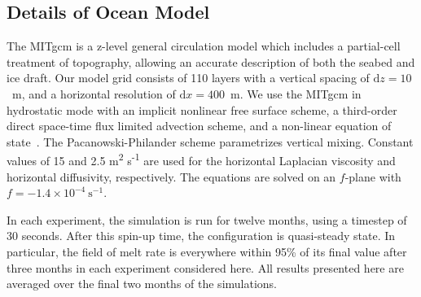 \documentclass[draft]{agujournal2019}
\begin{document}
\subsection{Details of Ocean Model}\label{S:Experiment:Model}
The MITgcm is a z-level general circulation model which includes a partial-cell treatment of topography, allowing an accurate description of both the seabed and ice draft. Our model grid consists of 110 layers with a vertical spacing of $\mathrm{d}z = 10$~m, and a horizontal resolution of $\mathrm{d}x=400$~m. We use the MITgcm in hydrostatic mode with an implicit nonlinear free surface scheme, a third-order direct space-time flux limited advection scheme, and a non-linear equation of state~\cite{Mcdougall2003JAtmosOceanTech}. The Pacanowski-Philander \cite{Pacanowski1981JPhysOcean} scheme parametrizes vertical mixing. Constant values of 15 and 2.5
m\textsuperscript{2} s\textsuperscript{-1} are used for the horizontal Laplacian viscosity and horizontal diffusivity, respectively. The equations are solved on an $f$-plane with $f = -1.4\times10^{-4}~\text{s}^{-1}$.

In each experiment, the simulation is run for twelve months, using a timestep of 30 \si{seconds}. After this spin-up time, the configuration is quasi-steady state. In particular, the field of melt rate is everywhere within 95\% of its final value after three months in each experiment considered here. All results presented here are averaged over the final two months of the simulations.
\end{document}

